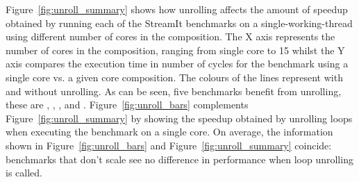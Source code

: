 Figure~\ref{fig:unroll_summary} shows how unrolling affects the amount of speedup obtained by running each of the StreamIt benchmarks on a single-working-thread using different number of cores in the composition.
The X axis represents the number of cores in the composition, ranging from single core to 15 whilst the Y axis compares the execution time in number of cycles for the benchmark using a single core vs. a given core composition.
The colours of the lines represent with and without unrolling.
As can be seen, five benchmarks benefit from unrolling, these are , , ,  and . 
Figure~\ref{fig:unroll_bars} complements Figure~\ref{fig:unroll_summary} by showing the speedup obtained by unrolling loops when executing the benchmark on a single core.
On average, the information shown in Figure~\ref{fig:unroll_bars} and Figure~\ref{fig:unroll_summary} coincide: benchmarks that don't scale see no difference in performance when loop unrolling is called.

